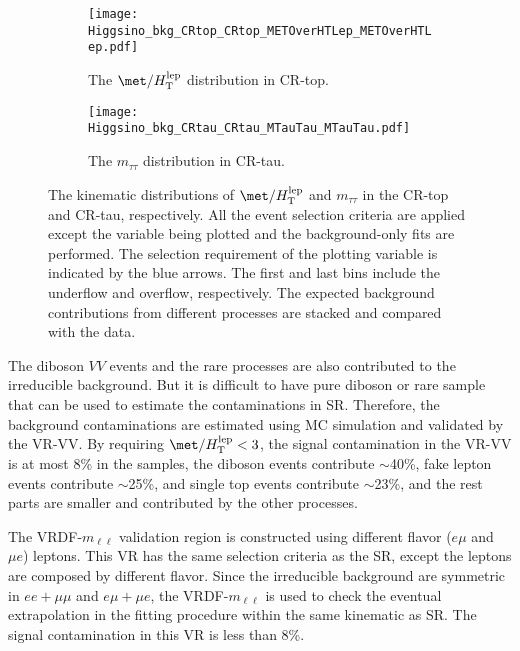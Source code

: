 \begin{figure}[ht]
    \begin{center}
        \begin{subfigure}[b]{0.48\textwidth}
            \texttt{[image: Higgsino\_bkg\_CRtop\_CRtop\_METOverHTLep\_METOverHTLep.pdf]}
            \caption{The $\met/H_\mathrm{T}^\mathrm{lep}$ distribution in CR-top.}
            \label{fig:bkg_kinematic_metOverHT_CRtop}
        \end{subfigure}
        \begin{subfigure}[b]{0.48\textwidth}
            \texttt{[image: Higgsino\_bkg\_CRtau\_CRtau\_MTauTau\_MTauTau.pdf]}
            \caption{The $m_{\tau \tau}$ distribution in CR-tau.}
            \label{fig:bkg_kinematic_mtautau_CRtau}
        \end{subfigure}
        \caption{The kinematic distributions of $\met/H_\mathrm{T}^\mathrm{lep}$ and $m_{\tau \tau}$ in the CR-top and CR-tau, respectively.
        All the event selection criteria are applied except the variable being plotted and the background-only fits are performed.
        The selection requirement of the plotting variable is indicated by the blue arrows.
        The first and last bins include the underflow and overflow, respectively.
        The expected background contributions from different processes are stacked and compared with the data.}
        \label{fig:bkg_kinematic_distributions_in_CRs}
    \end{center}
\end{figure}

The diboson $VV$ events and the rare processes are also contributed to the irreducible background.
But it is difficult to have pure diboson or rare sample that can be used to estimate the contaminations in SR.
Therefore, the background contaminations are estimated using MC simulation and validated by the VR-VV.
By requiring $\met/H_\mathrm{T}^\mathrm{lep} < 3$, the signal contamination in the VR-VV is at most 8\% in the samples, the diboson events contribute $\sim$40\%, fake lepton events contribute $\sim$25\%, \ttbar and single top events contribute $\sim$23\%, and the rest parts are smaller and contributed by the other processes.

The VRDF-$m_{\ell \ell}$ validation region is constructed using different flavor ($e\mu$ and $\mu e$) leptons.
This VR has the same selection criteria as the SR, except the leptons are composed by different flavor.
Since the irreducible background are symmetric in $ee+\mu\mu$ and $e\mu+\mu e$, the VRDF-$m_{\ell \ell}$ is used to check the eventual extrapolation in the fitting procedure within the same kinematic as SR.
The signal contamination in this VR is less than 8\%.

